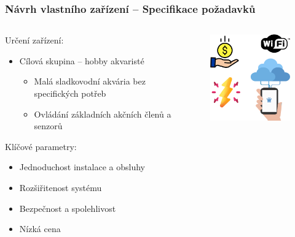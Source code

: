 \documentclass[%
  12pt,       				%
	t,                  %
	aspectratio=1610,   %
	unicode,						%
]{beamer}				    	%
\begin{document}
\begin{frame}[fragile]
	\frametitle{Návrh vlastního zařízení -- Specifikace požadavků}
	
	\begin{columns}[T] 								%
		\begin{column}{0.8\textwidth}		%
			Určení zařízení:\\[1ex]
			\begin{itemize}
				\item Cílová skupina -- hobby akvaristé
				\begin{itemize}
					\item Malá sladkovodní akvária bez specifických potřeb
					\item Ovládání základních akčních členů a senzorů
				\end{itemize}
			\end{itemize}
			\vspace{1.5ex}%
			Klíčové parametry:\\[1ex]
			\begin{itemize}
				\item Jednoduchost instalace a obsluhy
				\item Rozšiřitenost systému
				\item Bezpečnost a spolehlivost
				\item Nízká cena
			\end{itemize}
		\end{column}
		\begin{column}{0.2\textwidth}		%
			\begin{figure}%
				\centering
				\vspace{2cm}	              %
				\hspace{-4cm}
				\includegraphics[width=5cm]{obrazky/prezentace/icons.png}
			\end{figure}
		\end{column}
	\end{columns}											%
\end{frame}
\end{document}
